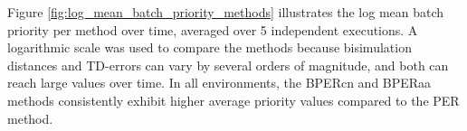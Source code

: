 

Figure \ref{fig:log_mean_batch_priority_methods} illustrates the log mean batch priority per method over time, averaged over 5 independent executions. A logarithmic scale was used to compare the methods because bisimulation distances and TD-errors can vary by several orders of magnitude, and both can reach large values over time. In all environments, the BPERcn and BPERaa methods consistently exhibit higher average priority values compared to the PER method.

